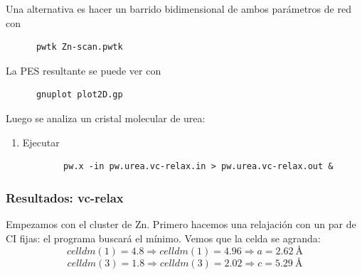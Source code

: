   Una alternativa es hacer un barrido bidimensional de ambos parámetros de red con
    \begin{verbatim}
      pwtk Zn-scan.pwtk
    \end{verbatim}

  La PES resultante se puede ver con
    \begin{verbatim}
      gnuplot plot2D.gp
    \end{verbatim}

  Luego se analiza un cristal molecular de urea:
    \begin{enumerate}
      \item Ejecutar
      \begin{verbatim}
        pw.x -in pw.urea.vc-relax.in > pw.urea.vc-relax.out &
      \end{verbatim}
    \end{enumerate}


\subsubsection{Resultados: vc-relax}

  Empezamos con el cluster de Zn. Primero hacemos una relajación con un par de CI fijas: el programa buscará el mínimo. Vemos que la celda se agranda:
    $$celldm(1) =  4.8 \Rightarrow celldm(1) = 4.96 \Rightarrow a = 2.62\ \si{\angstrom}$$
    $$celldm(3) =  1.8 \Rightarrow celldm(3) = 2.02 \Rightarrow c = 5.29\ \si{\angstrom}$$

